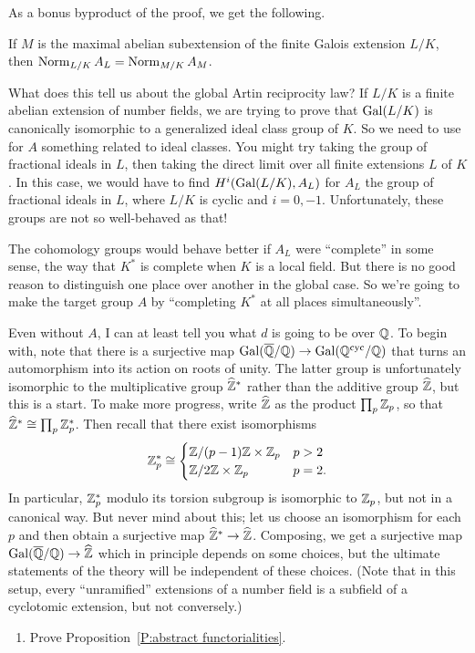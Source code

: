 As a bonus byproduct of the proof, we get the following.
\begin{cor}
If $M$ is the maximal abelian subextension of the finite Galois extension
$L/K$, then $\operatorname{Norm}_{L/K} A_L = \operatorname{Norm}_{M/K} A_M$.
\end{cor}


What does this tell us about the global Artin reciprocity law? If $L/K$
is a finite abelian extension of number fields, we are trying to
prove that $\operatorname{Gal}(L/K)$ is canonically isomorphic to a generalized ideal
class group of $K$. So we need to use for $A$ something related to ideal
classes. You might try taking the group of fractional ideals in $L$, then
taking the direct limit over all finite extensions $L$ of $K$.
In this case,
we would have to find $H^i(\operatorname{Gal}(L/K), A_L)$ for $A_L$ the group of fractional
ideals in $L$, where $L/K$ is cyclic and $i=0, -1$. Unfortunately, these groups
are not so well-behaved as that!

The cohomology groups would behave better if $A_L$ were
``complete'' in some sense, the way that $K^*$ is complete when $K$ is
a local field. But there is no good reason to distinguish one place over
another in the global case. So we're going to make the target group $A$
by ``completing $K^*$ at all places simultaneously''.

Even without $A$, I can at least tell you what $d$ is going to be over
$\mathbb{Q}$. To begin with, note that there is a surjective map $\operatorname{Gal}(\overline{\mathbb{Q}}/\mathbb{Q}) \to \operatorname{Gal}(\mathbb{Q}^{\operatorname{cyc}}/\mathbb{Q})$ that turns an automorphism into its action on roots of unity.
The latter group is unfortunately isomorphic to the multiplicative group $\widehat{\mathbb{Z}}^*$
rather than the additive group $\widehat{\mathbb{Z}}$, but this is a start. To make more progress, write $\widehat{\mathbb{Z}}$ as the product $\prod_p \mathbb{Z}_p$, so that $\widehat{\mathbb{Z}}^* \cong \prod_p \mathbb{Z}_p^*$. Then recall that there exist isomorphisms
\[
\mathbb{Z}_p^* \cong \begin{cases} \mathbb{Z}/(p-1)\mathbb{Z} \times \mathbb{Z}_p & p > 2 \\ \mathbb{Z}/2\mathbb{Z} \times \mathbb{Z}_p & p = 2. \end{cases}
\]
In particular, $\mathbb{Z}_p^*$ modulo its torsion subgroup is isomorphic to $\mathbb{Z}_p$, but not in a canonical way. But never mind about this; let us choose an isomorphism for each $p$ and then obtain a surjective map $\widehat{\mathbb{Z}}^* \to \widehat{\mathbb{Z}}$. Composing, we get a surjective map $\operatorname{Gal}(\overline{\mathbb{Q}}/\mathbb{Q}) \to \widehat{\mathbb{Z}}$ which in principle depends on some choices, but the ultimate statements of the theory will be independent of these choices.
(Note that in this setup, every ``unramified'' extensions of a number field is a subfield of a cyclotomic extension, but not conversely.)

\begin{enumerate}
\item
Prove Proposition~\ref{P:abstract functorialities}.
\end{enumerate}

%
